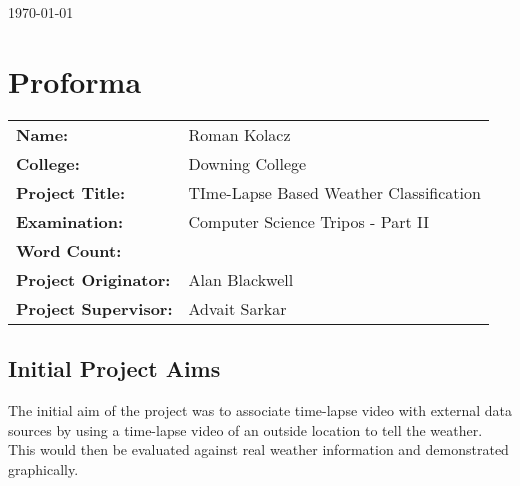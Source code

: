 \documentclass[14]{report}
\begin{document}
\begin{titlepage}

{\large \today}\\[3cm] %


 

\vfill %

\end{titlepage}

\chapter*{Proforma}

\begin{tabular}{ll}
  \bf Name: & Roman Kolacz \\
  \bf College: & Downing College \\
  \bf Project Title: & TIme-Lapse Based Weather Classification \\
  \bf Examination: & Computer Science Tripos - Part II \\
  \bf Word Count: \\
  \bf Project Originator: & Alan Blackwell \\
  \bf Project Supervisor: & Advait Sarkar \\
\end{tabular}

\section*{Initial Project Aims}
The initial aim of the project was to associate time-lapse video with external data sources by using a time-lapse video of an outside location to tell the weather. This would then be evaluated against real weather information and demonstrated graphically.
\end{document}
